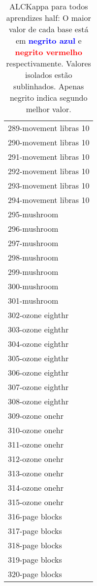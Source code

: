 \begin{table}[h]
\caption{ALCKappa para todos aprendizes half: O maior valor de cada base está em \textcolor{blue}{\textbf{negrito azul}} e \textcolor{red}{\textbf{negrito vermelho}} respectivamente. Valores isolados estão sublinhados. Apenas negrito indica segundo melhor valor.}
\begin{center}\begin{tabular}{l}
 & \\ \hline 289-movement libras 10 &  \\
290-movement libras 10 &  \\
291-movement libras 10 &  \\
292-movement libras 10 &  \\
293-movement libras 10 &  \\
294-movement libras 10 &  \\
295-mushroom &  \\ \hline
296-mushroom &  \\
297-mushroom &  \\
298-mushroom &  \\
299-mushroom &  \\
300-mushroom &  \\
301-mushroom &  \\
302-ozone eighthr &  \\ \hline
303-ozone eighthr &  \\
304-ozone eighthr &  \\
305-ozone eighthr &  \\
306-ozone eighthr &  \\
307-ozone eighthr &  \\
308-ozone eighthr &  \\
309-ozone onehr &  \\ \hline
310-ozone onehr &  \\
311-ozone onehr &  \\
312-ozone onehr &  \\
313-ozone onehr &  \\
314-ozone onehr &  \\
315-ozone onehr &  \\
316-page blocks &  \\ \hline
317-page blocks &  \\
318-page blocks &  \\
319-page blocks &  \\
320-page blocks &  \\\end{tabular}\label{stratsALCKappa9AllReduxb}
\end{center}
\end{table}
